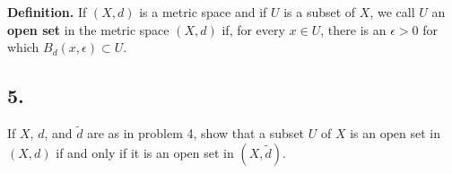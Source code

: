\documentclass{amsart}
\theoremstyle{plain}
\theoremstyle{definition}
\theoremstyle{remark}
\begin{document}
\vspace{.15in}

\noindent
{\bfseries Definition.} If $(X,d)$ is a metric space and if $U$ is a subset of $X$, we call $U$ an {\bfseries open set} in the metric space $(X,d)$ if, for every $x\in U$, there is an $\epsilon >0$ for which $B_d(x,\epsilon ) \subset U$.

\vspace{.15in}

\noindent
\subsection*{5.} If $X$, $d$, and $\widetilde{d}$ are as in problem 4, show that a subset $U$ of $X$ is an open set in $(X,d)$ if and only if it is an open set in $(X,\widetilde{d})$.
\end{document}
